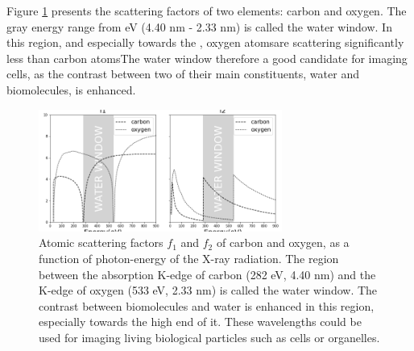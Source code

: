 Figure \ref{fig:waterwindow} presents the scattering factors of two
elements: carbon and oxygen. The gray energy range from \DIFdelbegin {}\DIFdelend \DIFaddbegin {}\DIFaddend eV
(4.40 nm - 2.33 nm) is called the water window. In this region, and
especially towards the \DIFdelbegin {}\DIFdelend \DIFaddbegin {}\DIFaddend , oxygen atoms\DIFdelbegin {}\DIFdelend \DIFaddbegin {}\DIFaddend are scattering significantly less than carbon atoms\DIFdelbegin {}\DIFdelend \DIFaddbegin {}\DIFaddend The water window
\DIFaddbegin {}\DIFaddend therefore a good candidate for imaging cells, as the contrast
between two of their main constituents, water and biomolecules, is
enhanced.

\begin{figure}[h]\label{fig:waterwindow}
\centering 
\includegraphics[width=80mm]{waterwindow.png}

\caption{Atomic scattering factors $f_1$ and $f_2$ of carbon and
  oxygen, as a function of photon-energy of the X-ray radiation. The
  region between the absorption K-edge of carbon (282 eV, 4.40 nm) and
  the K-edge of oxygen (533 eV, 2.33 nm) is called the water window.
  The contrast between biomolecules and water is enhanced in this
  region, especially towards the high end of it. These wavelengths
  could be used for imaging living biological particles such as cells
  or organelles.}
\end{figure}

